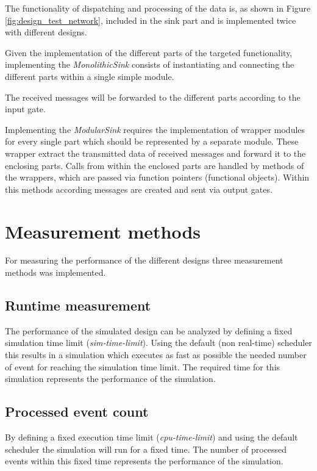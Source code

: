 The functionality of dispatching and processing of the data is, as shown in Figure \ref{fig:design_test_network}, included in the sink part and is implemented twice with different designs.


Given the implementation of the different parts of the targeted functionality, implementing the \emph{MonolithicSink} consists of instantiating and connecting the different parts within a single simple module.

The received messages will be forwarded to the different parts according to the input gate.

Implementing the \emph{ModularSink} requires the implementation of wrapper modules for every single part which should be represented by a separate module.
These wrapper extract the transmitted data of received messages and forward it to the enclosing parts.
Calls from within the enclosed parts are handled by methods of the wrappers, which are passed via function pointers (functional objects).
Within this methods according messages are created and sent via output gates.

\section{Measurement methods}
\label{sec:measurements_methods}
For measuring the performance of the different designs three measurement methods was implemented.

\subsection{Runtime measurement}
\label{sec:measurements_methods_runtime}
The performance of the simulated design can be analyzed by defining a fixed simulation time limit (\emph{sim-time-limit}).
Using the default (non real-time) scheduler this results in a simulation which executes as fast as possible the needed number of event for reaching the simulation time limit.
The required time for this simulation represents the performance of the simulation.

\subsection{Processed event count}
\label{sec:measurements_methods_event}
By defining a fixed execution time limit (\emph{cpu-time-limit}) and using the default scheduler the simulation will run for a fixed time.
The number of processed events within this fixed time represents the performance of the simulation.

